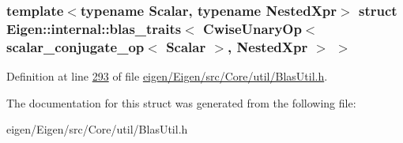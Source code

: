 \subsubsection*{template$<$typename Scalar, typename Nested\+Xpr$>$\newline
struct Eigen\+::internal\+::blas\+\_\+traits$<$ Cwise\+Unary\+Op$<$ scalar\+\_\+conjugate\+\_\+op$<$ Scalar $>$, Nested\+Xpr $>$ $>$}



Definition at line \hyperlink{eigen_2_eigen_2src_2_core_2util_2_blas_util_8h_source_l00293}{293} of file \hyperlink{eigen_2_eigen_2src_2_core_2util_2_blas_util_8h_source}{eigen/\+Eigen/src/\+Core/util/\+Blas\+Util.\+h}.



The documentation for this struct was generated from the following file\+:\begin{DoxyCompactItemize}
\item 
eigen/\+Eigen/src/\+Core/util/\+Blas\+Util.\+h\end{DoxyCompactItemize}
